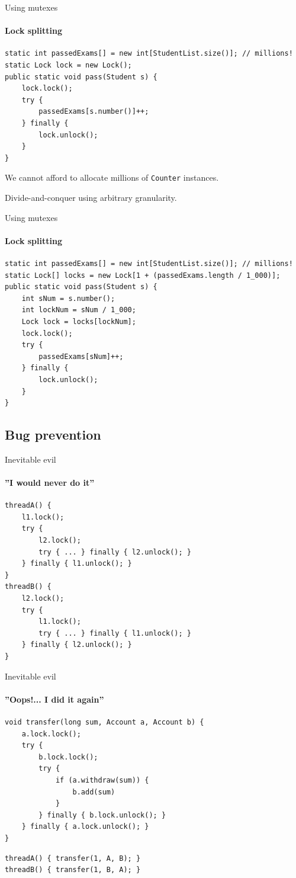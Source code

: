 \begin{frame}[fragile]{Using mutexes}
\framesubtitle{Lock splitting}

\begin{verbatim}
static int passedExams[] = new int[StudentList.size()]; // millions!
static Lock lock = new Lock();
public static void pass(Student s) {
    lock.lock();
    try { 
        passedExams[s.number()]++; 
    } finally { 
        lock.unlock();
    }
}
\end{verbatim}

\pause
We cannot afford to allocate millions of \texttt{Counter} instances.

\pause
Divide-and-conquer using arbitrary granularity.

\end{frame}

\begin{frame}{Using mutexes}
\framesubtitle{Lock splitting}

\begin{verbatim}
static int passedExams[] = new int[StudentList.size()]; // millions!
static Lock[] locks = new Lock[1 + (passedExams.length / 1_000)];
public static void pass(Student s) {
    int sNum = s.number();
    int lockNum = sNum / 1_000;
    Lock lock = locks[lockNum];
    lock.lock();
    try {
        passedExams[sNum]++;
    } finally {
        lock.unlock();
    }
}
\end{verbatim}
\end{frame}

\subsection{Bug prevention}
\showTOCSub

\begin{frame}[fragile]{Inevitable evil}
\framesubtitle{''I would never do it''}

\begin{verbatim}
threadA() {
    l1.lock();
    try {
        l2.lock();
        try { ... } finally { l2.unlock(); }
    } finally { l1.unlock(); }
}
threadB() {
    l2.lock();
    try {
        l1.lock();
        try { ... } finally { l1.unlock(); }
    } finally { l2.unlock(); }
}
\end{verbatim}
\end{frame}

\begin{frame}[fragile]{Inevitable evil}
\framesubtitle{''Oops!... I did it again''}

\begin{verbatim}
void transfer(long sum, Account a, Account b) {
    a.lock.lock();
    try {
        b.lock.lock();
        try {
            if (a.withdraw(sum)) {
                b.add(sum)
            }
        } finally { b.lock.unlock(); }
    } finally { a.lock.unlock(); }
}
\end{verbatim}

\pause

\begin{verbatim}
threadA() { transfer(1, A, B); }
threadB() { transfer(1, B, A); }
\end{verbatim}
\end{frame}


